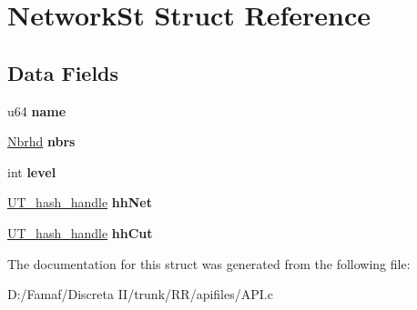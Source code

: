 \hypertarget{struct_network_st}{\section{Network\+St Struct Reference}
\label{struct_network_st}
}
\subsection*{Data Fields}
\begin{DoxyCompactItemize}
\item 
\hypertarget{struct_network_st_ad1d9cbcfd37b9b413e8d8d67a719d165}{u64 {\bfseries name}}\label{struct_network_st_ad1d9cbcfd37b9b413e8d8d67a719d165}

\item 
\hypertarget{struct_network_st_afd53be0446045fad0bd6682824f39336}{\hyperlink{struct_neighbourhood_st}{Nbrhd} {\bfseries nbrs}}\label{struct_network_st_afd53be0446045fad0bd6682824f39336}

\item 
\hypertarget{struct_network_st_acf4d33ee4cff36f69b924471174dcb11}{int {\bfseries level}}\label{struct_network_st_acf4d33ee4cff36f69b924471174dcb11}

\item 
\hypertarget{struct_network_st_ae7b1690ddd7f2fa9f4d567b20df26d2b}{\hyperlink{struct_u_t__hash__handle}{U\+T\+\_\+hash\+\_\+handle} {\bfseries hh\+Net}}\label{struct_network_st_ae7b1690ddd7f2fa9f4d567b20df26d2b}

\item 
\hypertarget{struct_network_st_a7447676827c96d693061a0202d9bc337}{\hyperlink{struct_u_t__hash__handle}{U\+T\+\_\+hash\+\_\+handle} {\bfseries hh\+Cut}}\label{struct_network_st_a7447676827c96d693061a0202d9bc337}

\end{DoxyCompactItemize}


The documentation for this struct was generated from the following file\+:\begin{DoxyCompactItemize}
\item 
D\+:/\+Famaf/\+Discreta I\+I/trunk/\+R\+R/apifiles/A\+P\+I.\+c\end{DoxyCompactItemize}
